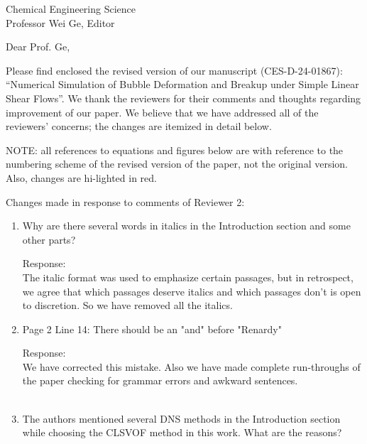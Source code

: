 \documentclass{letter}
\date{\today}
\begin{document}
\begin{letter}{
Chemical Engineering Science\\
Professor Wei Ge, Editor\\}

\opening{Dear Prof. Ge,}

Please find enclosed the revised version of our manuscript (CES-D-24-01867):
``Numerical Simulation of Bubble Deformation and Breakup under 
Simple Linear Shear Flows''.
We thank the reviewers for their comments and thoughts regarding improvement 
of our paper. We believe that we have addressed all of the reviewers’ 
concerns; the changes are itemized in detail below.

\par\noindent
NOTE: all references to equations and figures below are with
reference to the numbering scheme of the revised version of the paper,
not the original version.  Also, changes are hi-lighted in red.
\par\noindent

Changes made in response to comments of Reviewer 2: \begin{enumerate}
\item
\textsf
{Why are there several words in italics in the Introduction section and some other parts?}
\vspace{3 mm}

Response: \\
The italic format was used to emphasize certain passages, but in retrospect, we agree that which passages deserve italics and which passages don't is open to discretion.  So we have removed all the italics. \\

\item
\textsf
{Page 2 Line 14: There should be an "and" before "Renardy"}
\vspace{3 mm}

Response: \\
We have corrected this mistake.  Also we have made complete run-throughs of the  paper checking for grammar errors and awkward sentences. \\
\\

\par\noindent
\item
\textsf
{The authors mentioned several DNS methods in the Introduction section while choosing the CLSVOF method in this work. What are the reasons?}
\vspace{3 mm}


\end{enumerate}
\end{letter}
\end{document}
